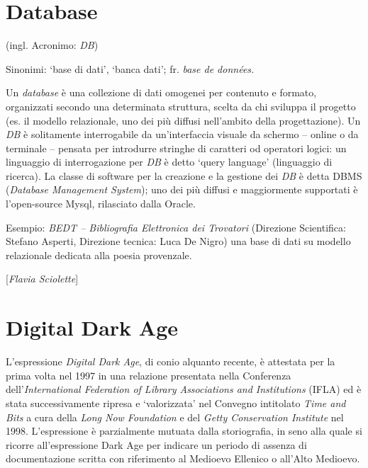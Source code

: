 
\chapter{Database}

(ingl. Acronimo: \emph{DB})

Sinonimi: `base di dati', `banca dati'; fr. \emph{base de données.}

Un \emph{database} è una collezione di dati omogenei per contenuto e
formato, organizzati secondo una determinata struttura, scelta da chi
sviluppa il progetto (es. il modello relazionale, uno dei più diffusi
nell'ambito della progettazione). Un \emph{DB} è solitamente
interrogabile da un'interfaccia visuale da schermo -- online o da
terminale -- pensata per introdurre stringhe di caratteri od operatori
logici: un linguaggio di interrogazione per \emph{DB} è detto `query
language' (linguaggio di ricerca). La classe di software per la
creazione e la gestione dei \emph{DB} è detta DBMS (\emph{Database
Management System}); uno dei più diffusi e maggiormente supportati è
l'open-source Mysql, rilasciato dalla Oracle.

Esempio: \emph{BEDT -- Bibliografia Elettronica dei Trovatori}
(Direzione Scientifica: Stefano Asperti, Direzione tecnica: Luca De
Nigro) una base di dati su modello relazionale dedicata alla poesia
provenzale.

\hrulefill 

{[}\emph{Flavia Sciolette}{]}

\chapter{Digital Dark Age}

L'espressione \emph{Digital Dark Age}, di conio alquanto recente, è
attestata per la prima volta nel 1997 in una relazione presentata nella
Conferenza dell'\emph{International Federation of Library Associations
and Institutions} (IFLA) ed è stata successivamente ripresa e
`valorizzata' nel Convegno intitolato \emph{Time and Bits} a cura della
\emph{Long Now Foundation} e del \emph{Getty Conservation Institute} nel
1998. L'espressione è parzialmente mutuata dalla storiografia, in seno
alla quale si ricorre all'espressione Dark Age per indicare un periodo
di assenza di documentazione scritta con riferimento al Medioevo
Ellenico o all'Alto Medioevo.

